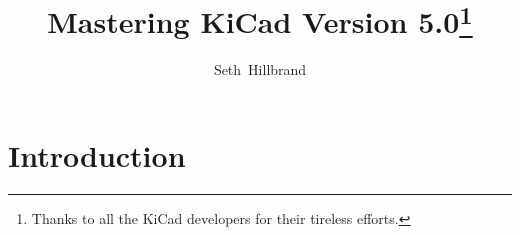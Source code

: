\documentclass{tufte-book}
\title{Mastering KiCad Version 5.0\thanks{Thanks to all the KiCad developers for their tireless efforts.}}
\author[Seth Hillbrand]{Seth~Hillbrand}
\begin{document}

\cleardoublepage
\chapter*{Introduction}



\mainmatter















\backmatter





\printindex
\end{document}
